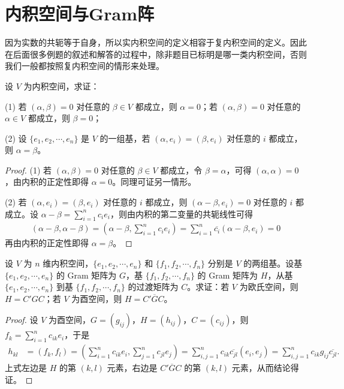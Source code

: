 \documentclass[../../main.tex]{subfiles}
\begin{document}
\section{内积空间与Gram阵}

\begin{remark}
因为实数的共轭等于自身，所以实内积空间的定义相容于复内积空间的定义。因此在后面很多例题的叙述和解答的过程中，除非题目已标明是哪一类内积空间，否则我们一般都按照复内积空间的情形来处理。
\end{remark}

\begin{proposition}\label{proposition:例9.2}
设 $V$ 为内积空间，求证：

(1) 若 $(\alpha,\beta)=0$ 对任意的 $\beta\in V$ 都成立，则 $\alpha = 0$；若 $(\alpha,\beta)=0$ 对任意的 $\alpha\in V$ 都成立，则 $\beta = 0$；

(2) 设 $\{e_1,e_2,\cdots,e_n\}$ 是 $V$ 的一组基，若 $(\alpha,e_i)=(\beta,e_i)$ 对任意的 $i$ 都成立，则 $\alpha = \beta$。
\end{proposition}
\begin{proof}
(1) 若 $(\alpha,\beta)=0$ 对任意的 $\beta\in V$ 都成立，令 $\beta = \alpha$，可得 $(\alpha,\alpha)=0$，由内积的正定性即得 $\alpha = 0$。同理可证另一情形。

(2) 若 $(\alpha,e_i)=(\beta,e_i)$ 对任意的 $i$ 都成立，则 $(\alpha - \beta,e_i)=0$ 对任意的 $i$ 都成立。设 $\alpha - \beta = \sum_{i = 1}^{n}c_ie_i$，则由内积的第二变量的共轭线性可得
\begin{align*}
(\alpha - \beta,\alpha - \beta)=(\alpha - \beta,\sum_{i = 1}^{n}c_ie_i)=\sum_{i = 1}^{n}\overline{c_i}(\alpha - \beta,e_i)=0
\end{align*}
再由内积的正定性即得 $\alpha = \beta$。
\end{proof}

\begin{proposition}\label{proposition:例9.3}
设 $V$ 为 $n$ 维内积空间，$\{e_1,e_2,\cdots,e_n\}$ 和 $\{f_1,f_2,\cdots,f_n\}$ 分别是 $V$ 的两组基。设基 $\{e_1,e_2,\cdots,e_n\}$ 的 Gram 矩阵为 $G$，基 $\{f_1,f_2,\cdots,f_n\}$ 的 Gram 矩阵为 $H$，从基 $\{e_1,e_2,\cdots,e_n\}$ 到基 $\{f_1,f_2,\cdots,f_n\}$ 的过渡矩阵为 $C$。求证：若 $V$ 为欧氏空间，则 $H = C'GC$；若 $V$ 为酉空间，则 $H = C' \overline{G}C$。
\end{proposition}
\begin{proof}
设 $V$ 为酉空间，$G = (g_{ij})$，$H = (h_{ij})$，$C = (c_{ij})$，则 $f_k = \sum_{i = 1}^{n}c_{ik}e_i$，于是
\begin{align*}
h_{kl}&=(f_k,f_l)=(\sum_{i = 1}^{n}c_{ik}e_i,\sum_{j = 1}^{n}c_{jl}e_j)=\sum_{i,j = 1}^{n}c_{ik}\overline{c_{jl}}(e_i,e_j)=\sum_{i,j = 1}^{n}c_{ik}g_{ij}\overline{c_{jl}}.
\end{align*}
上式左边是 $H$ 的第 $(k, l)$ 元素，右边是 $C' \overline{G}C$ 的第 $(k, l)$ 元素，从而结论得证。
\end{proof}
\end{document}
